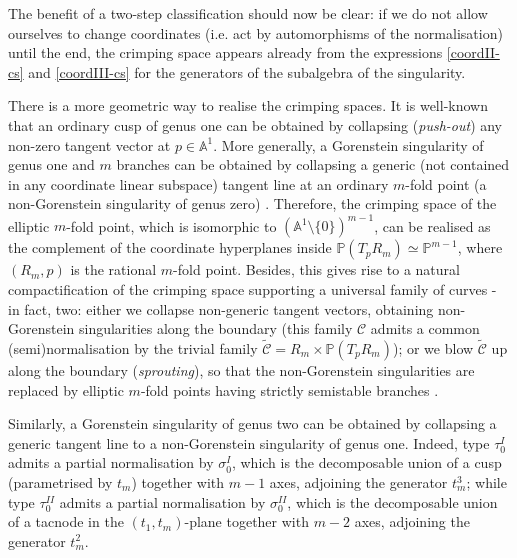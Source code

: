 \documentclass[11pt]{amsart}
\newcommand{\PP}{\mathbb P}
\newcommand{\Aaff}{\mathbb A}
\theoremstyle{plain}
\theoremstyle{definition}
\begin{document}
The benefit of a two-step classification should now be clear: if we do not allow ourselves to change coordinates (i.e. act by automorphisms of the normalisation) until the end, the crimping space appears already from the expressions \eqref{coordII-cs} and \eqref{coordIII-cs} for the generators of the subalgebra of the singularity.

\smallskip

There is a more geometric way to realise the crimping spaces. It is well-known that an ordinary cusp of genus one can be obtained by collapsing (\emph{push-out}) any non-zero tangent vector at $p\in\Aaff^1$. More generally, a Gorenstein singularity of genus one and $m$ branches can be obtained by collapsing a generic (not contained in any coordinate linear subspace) tangent line at an ordinary $m$-fold point (a non-Gorenstein singularity of genus zero) \cite[Lemma 2.2]{SMY1}. Therefore, the crimping space of the elliptic $m$-fold point, which is isomorphic to $(\Aaff^1\setminus\{0\})^{m-1}$, can be realised as the complement of the coordinate hyperplanes inside $\PP(T_pR_m)\simeq\PP^{m-1}$, where $(R_m,p)$ is the rational $m$-fold point. Besides, this gives rise to a natural compactification of the crimping space supporting a universal family of curves - in fact, two: either we collapse non-generic tangent vectors, obtaining non-Gorenstein singularities along the boundary (this family $\mathcal C$ admits a common (semi)normalisation by the trivial family $\widetilde{\mathcal C}=R_m\times \PP(T_pR_m)$); or we blow $\widetilde{\mathcal C}$ up along the boundary (\emph{sprouting}), so that the non-Gorenstein singularities are replaced by elliptic $m$-fold points having strictly semistable branches \cite[\S 2.2-3]{SMY2}.

Similarly, a Gorenstein singularity of genus two can be obtained by collapsing a generic tangent line to a non-Gorenstein singularity of genus one. Indeed, type $\tau_0^{I}$ admits a partial normalisation by $\sigma_0^{I}$, which is the decomposable union of a cusp (parametrised by $t_m$) together with $m-1$ axes, adjoining the generator $t_m^3$; while type $\tau_0^{I\!I}$ admits a partial normalisation by $\sigma_0^{I\!I}$, which is the decomposable union of a tacnode in the $(t_1,t_m)$-plane together with $m-2$ axes, adjoining the generator $t_m^2$.
\end{document}
